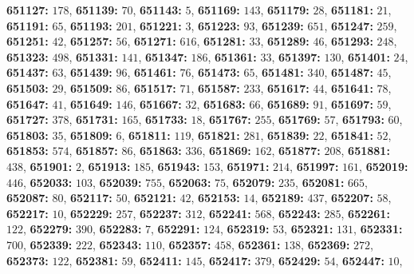 \textsf{\bfseries 651127:} $178$, \textsf{\bfseries 651139:} $70$, \textsf{\bfseries 651143:} $5$, \textsf{\bfseries 651169:} $143$, \textsf{\bfseries 651179:} $28$, \textsf{\bfseries 651181:} $21$, \textsf{\bfseries 651191:} $65$, \textsf{\bfseries 651193:} $201$, \textsf{\bfseries 651221:} $3$, \textsf{\bfseries 651223:} $93$, \textsf{\bfseries 651239:} $651$, \textsf{\bfseries 651247:} $259$, \textsf{\bfseries 651251:} $42$, \textsf{\bfseries 651257:} $56$, \textsf{\bfseries 651271:} $616$, \textsf{\bfseries 651281:} $33$, \textsf{\bfseries 651289:} $46$, \textsf{\bfseries 651293:} $248$, \textsf{\bfseries 651323:} $498$, \textsf{\bfseries 651331:} $141$, \textsf{\bfseries 651347:} $186$, \textsf{\bfseries 651361:} $33$, \textsf{\bfseries 651397:} $130$, \textsf{\bfseries 651401:} $24$, \textsf{\bfseries 651437:} $63$, \textsf{\bfseries 651439:} $96$, \textsf{\bfseries 651461:} $76$, \textsf{\bfseries 651473:} $65$, \textsf{\bfseries 651481:} $340$, \textsf{\bfseries 651487:} $45$, \textsf{\bfseries 651503:} $29$, \textsf{\bfseries 651509:} $86$, \textsf{\bfseries 651517:} $71$, \textsf{\bfseries 651587:} $233$, \textsf{\bfseries 651617:} $44$, \textsf{\bfseries 651641:} $78$, \textsf{\bfseries 651647:} $41$, \textsf{\bfseries 651649:} $146$, \textsf{\bfseries 651667:} $32$, \textsf{\bfseries 651683:} $66$, \textsf{\bfseries 651689:} $91$, \textsf{\bfseries 651697:} $59$, \textsf{\bfseries 651727:} $378$, \textsf{\bfseries 651731:} $165$, \textsf{\bfseries 651733:} $18$, \textsf{\bfseries 651767:} $255$, \textsf{\bfseries 651769:} $57$, \textsf{\bfseries 651793:} $60$, \textsf{\bfseries 651803:} $35$, \textsf{\bfseries 651809:} $6$, \textsf{\bfseries 651811:} $119$, \textsf{\bfseries 651821:} $281$, \textsf{\bfseries 651839:} $22$, \textsf{\bfseries 651841:} $52$, \textsf{\bfseries 651853:} $574$, \textsf{\bfseries 651857:} $86$, \textsf{\bfseries 651863:} $336$, \textsf{\bfseries 651869:} $162$, \textsf{\bfseries 651877:} $208$, \textsf{\bfseries 651881:} $438$, \textsf{\bfseries 651901:} $2$, \textsf{\bfseries 651913:} $185$, \textsf{\bfseries 651943:} $153$, \textsf{\bfseries 651971:} $214$, \textsf{\bfseries 651997:} $161$, \textsf{\bfseries 652019:} $446$, \textsf{\bfseries 652033:} $103$, \textsf{\bfseries 652039:} $755$, \textsf{\bfseries 652063:} $75$, \textsf{\bfseries 652079:} $235$, \textsf{\bfseries 652081:} $665$, \textsf{\bfseries 652087:} $80$, \textsf{\bfseries 652117:} $50$, \textsf{\bfseries 652121:} $42$, \textsf{\bfseries 652153:} $14$, \textsf{\bfseries 652189:} $437$, \textsf{\bfseries 652207:} $58$, \textsf{\bfseries 652217:} $10$, \textsf{\bfseries 652229:} $257$, \textsf{\bfseries 652237:} $312$, \textsf{\bfseries 652241:} $568$, \textsf{\bfseries 652243:} $285$, \textsf{\bfseries 652261:} $122$, \textsf{\bfseries 652279:} $390$, \textsf{\bfseries 652283:} $7$, \textsf{\bfseries 652291:} $124$, \textsf{\bfseries 652319:} $53$, \textsf{\bfseries 652321:} $131$, \textsf{\bfseries 652331:} $700$, \textsf{\bfseries 652339:} $222$, \textsf{\bfseries 652343:} $110$, \textsf{\bfseries 652357:} $458$, \textsf{\bfseries 652361:} $138$, \textsf{\bfseries 652369:} $272$, \textsf{\bfseries 652373:} $122$, \textsf{\bfseries 652381:} $59$, \textsf{\bfseries 652411:} $145$, \textsf{\bfseries 652417:} $379$, \textsf{\bfseries 652429:} $54$, \textsf{\bfseries 652447:} $10$, 
